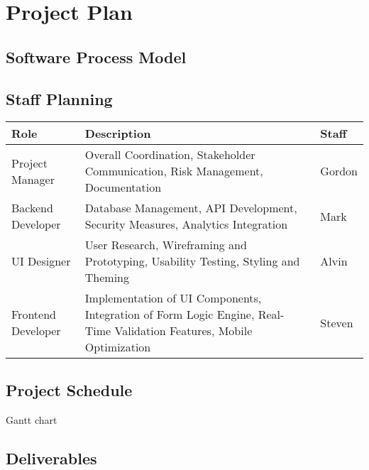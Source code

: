 \section{Project Plan}

\subsection{Software Process Model}
\subsection{Staff Planning}

\begin{table}[h]
    \begin{tabularx}{\textwidth}{|l|X|l|}
    \hline
    \textbf{Role} & \textbf{Description} & \textbf{Staff} \\
    \hline
    Project Manager &
    Overall Coordination, Stakeholder Communication, Risk Management, Documentation &
    Gordon \\
    \hline
    Backend Developer &
    Database Management, API Development, Security Measures, Analytics Integration &
    Mark \\
    \hline
    UI Designer &
    User Research, Wireframing and Prototyping, Usability Testing, Styling and Theming &
    Alvin \\
    \hline
    Frontend Developer &
    Implementation of UI Components, Integration of Form Logic Engine, Real-Time Validation Features, Mobile Optimization &
    Steven \\
    \hline
    \end{tabularx}
\end{table}

\subsection{Project Schedule}

Gantt chart

\subsection{Deliverables}
